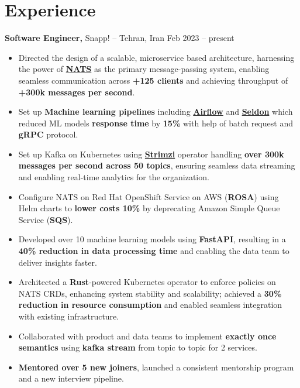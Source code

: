 \section*{Experience}

\textbf{Software Engineer,} Snapp! -- Tehran, Iran \hfill Feb 2023 -- present
\vspace{-10pt}
\begin{itemize}
      \item Directed the design of a scalable, microservice based architecture, harnessing the power of
            \href{https://nats.io}{\textbf{NATS}} as the primary message-passing system,
            enabling seamless communication across \textbf{+125 clients} and achieving throughput of \textbf{+300k messages per second}.
      \item Set up \textbf{Machine learning pipelines} including \href{https://airflow.apache.org}{\textbf{Airflow}} and
            \href{https://www.seldon.io}{\textbf{Seldon}} which reduced ML models \textbf{response time} by \textbf{15\%}
            with help of batch request and \textbf{gRPC} protocol.
      \item Set up Kafka on Kubernetes using \href{https://strimzi.io}{\textbf{Strimzi}} operator handling \textbf{over 300k messages per second across 50 topics},
            ensuring seamless data streaming and enabling real-time analytics for the organization.
      \item Configure NATS on Red Hat OpenShift Service on AWS (\textbf{ROSA})
            using Helm charts to \textbf{lower costs 10\%} by deprecating Amazon Simple Queue Service (\textbf{SQS}).
      \item Developed over 10 machine learning models using \textbf{FastAPI}, resulting in a \textbf{40\% reduction in data processing time} and enabling the data team to deliver insights faster.
      \item Architected a \textbf{Rust}-powered Kubernetes operator to enforce policies on NATS CRDs, enhancing system stability and scalability; achieved a \textbf{30\% reduction in resource consumption} and enabled seamless integration with existing infrastructure.
      \item Collaborated with product and data teams to implement \textbf{exactly once semantics} using \textbf{kafka stream} from topic to topic for 2 services.
      \item \textbf{Mentored over 5 new joiners}, launched a consistent mentorship program and a new interview pipeline.
\end{itemize}

